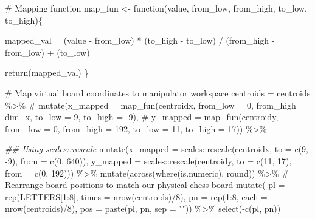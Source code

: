 \documentclass[
  letterpaper,
  DIV=11,
  numbers=noendperiod]{scrreprt}
\newenvironment{Shaded}{\begin{snugshade}}{\end{snugshade}}
\newcommand{\AttributeTok}[1]{\textcolor[rgb]{0.40,0.45,0.13}{#1}}
\newcommand{\CommentTok}[1]{\textcolor[rgb]{0.37,0.37,0.37}{#1}}
\newcommand{\ControlFlowTok}[1]{\textcolor[rgb]{0.00,0.23,0.31}{#1}}
\newcommand{\DecValTok}[1]{\textcolor[rgb]{0.68,0.00,0.00}{#1}}
\newcommand{\DocumentationTok}[1]{\textcolor[rgb]{0.37,0.37,0.37}{\textit{#1}}}
\newcommand{\FunctionTok}[1]{\textcolor[rgb]{0.28,0.35,0.67}{#1}}
\newcommand{\NormalTok}[1]{\textcolor[rgb]{0.00,0.23,0.31}{#1}}
\newcommand{\OtherTok}[1]{\textcolor[rgb]{0.00,0.23,0.31}{#1}}
\newcommand{\SpecialCharTok}[1]{\textcolor[rgb]{0.37,0.37,0.37}{#1}}
\newcommand{\StringTok}[1]{\textcolor[rgb]{0.13,0.47,0.30}{#1}}
\begin{document}
\begin{Shaded}
\begin{Highlighting}[]
\CommentTok{\# Mapping function}
\NormalTok{map\_fun }\OtherTok{\textless{}{-}} \ControlFlowTok{function}\NormalTok{(value, from\_low, from\_high, to\_low, to\_high)\{}
  
\NormalTok{  mapped\_val }\OtherTok{=}\NormalTok{ (value }\SpecialCharTok{{-}}\NormalTok{ from\_low) }\SpecialCharTok{*}\NormalTok{ (to\_high }\SpecialCharTok{{-}}\NormalTok{ to\_low) }\SpecialCharTok{/}\NormalTok{ (from\_high }\SpecialCharTok{{-}}\NormalTok{ from\_low) }\SpecialCharTok{+}\NormalTok{ (to\_low)}
  
  \FunctionTok{return}\NormalTok{(mapped\_val)}
\NormalTok{\}}


\CommentTok{\# Map virtual board coordinates to manipulator workspace}
\NormalTok{centroids }\OtherTok{=}\NormalTok{ centroids }\SpecialCharTok{\%\textgreater{}\%} 
    \CommentTok{\# mutate(x\_mapped = map\_fun(centroidx, from\_low = 0, from\_high = dim\_x, to\_low = 9, to\_high = {-}9),}
    \CommentTok{\#        y\_mapped = map\_fun(centroidy, from\_low = 0, from\_high = 192, to\_low = 11, to\_high = 17)) \%\textgreater{}\% }
    
    \DocumentationTok{\#\# Using scales::rescale}
    \FunctionTok{mutate}\NormalTok{(}\AttributeTok{x\_mapped =}\NormalTok{ scales}\SpecialCharTok{::}\FunctionTok{rescale}\NormalTok{(centroidx, }\AttributeTok{to =} \FunctionTok{c}\NormalTok{(}\DecValTok{9}\NormalTok{, }\SpecialCharTok{{-}}\DecValTok{9}\NormalTok{), }\AttributeTok{from =} \FunctionTok{c}\NormalTok{(}\DecValTok{0}\NormalTok{, }\DecValTok{640}\NormalTok{)),}
           \AttributeTok{y\_mapped =}\NormalTok{ scales}\SpecialCharTok{::}\FunctionTok{rescale}\NormalTok{(centroidy, }\AttributeTok{to =} \FunctionTok{c}\NormalTok{(}\DecValTok{11}\NormalTok{, }\DecValTok{17}\NormalTok{), }\AttributeTok{from =} \FunctionTok{c}\NormalTok{(}\DecValTok{0}\NormalTok{, }\DecValTok{192}\NormalTok{))) }\SpecialCharTok{\%\textgreater{}\%} 
    \FunctionTok{mutate}\NormalTok{(}\FunctionTok{across}\NormalTok{(}\FunctionTok{where}\NormalTok{(is.numeric), round)) }\SpecialCharTok{\%\textgreater{}\%} 
    \CommentTok{\# Rearrange board positions to match our physical chess board}
    \FunctionTok{mutate}\NormalTok{(}
      \AttributeTok{pl =} \FunctionTok{rep}\NormalTok{(LETTERS[}\DecValTok{1}\SpecialCharTok{:}\DecValTok{8}\NormalTok{], }\AttributeTok{times =} \FunctionTok{nrow}\NormalTok{(centroids)}\SpecialCharTok{/}\DecValTok{8}\NormalTok{),}
      \AttributeTok{pn =} \FunctionTok{rep}\NormalTok{(}\DecValTok{1}\SpecialCharTok{:}\DecValTok{8}\NormalTok{, }\AttributeTok{each =} \FunctionTok{nrow}\NormalTok{(centroids)}\SpecialCharTok{/}\DecValTok{8}\NormalTok{),}
      \AttributeTok{pos =} \FunctionTok{paste}\NormalTok{(pl, pn, }\AttributeTok{sep =} \StringTok{""}\NormalTok{)) }\SpecialCharTok{\%\textgreater{}\%} 
    \FunctionTok{select}\NormalTok{(}\SpecialCharTok{{-}}\FunctionTok{c}\NormalTok{(pl, pn))}


\end{Highlighting}
\end{Shaded}
\end{document}
